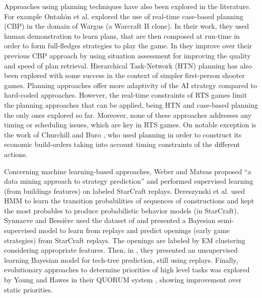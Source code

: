 \documentclass[journal]{IEEEtran}
\begin{document}
Approaches using planning techniques have also been explored in the literature. For example Onta\~{n}\'{o}n et al. \cite{CBR_Planning} explored the use of real-time case-based planning (CBP) in the domain of Wargus (a Warcraft II clone). In their work, they used human demonstration to learn plans, that are then composed at run-time in order to form full-fledges strategies to play the game. In \cite{PlanRetrieval} they improve over  their previous CBP approach by using situation assessment for improving the quality and speed of plan retrieval. Hierarchical Task-Network (HTN) planning has also been explored with some success in the context of simpler first-person shooter games. Planning approaches offer more adaptivity of the AI strategy compared to hard-coded approaches. However, the real-time constraints of RTS games limit the planning approaches that can be applied, being HTN and case-based planning the only ones explored so far. Moreover, none of these approaches addresses any timing or scheduling issues, which are key in RTS games. On notable exception is the work of Churchill and Buro \cite{churchill2011build}, who used planning in order to construct its economic build-orders taking into account timing constraints of the different actions.

Concerning machine learning-based approaches, Weber and Mateas \cite{WeberCig09} proposed ``a data mining approach to strategy prediction'' and performed supervised learning (from buildings features) on labeled StarCraft replays. Dereszynski et al. \cite{HMMstrat_RTS_AIIDE11} used HMM to learn the transition probabilities of sequences of constructions and kept the most probables to produce probabilistic behavior models (in StarCraft). Synnaeve and Bessi\`{e}re \cite{SynnaeveOpeningCig11} used the dataset of \cite{WeberCig09} and presented a Bayesian semi-supervised model to learn from replays and predict openings (early game strategies) from StarCraft replays. The openings are labeled by EM clustering considering appropriate features. Then, in \cite{SynnaeveAIIDE11}, they presented an unsupervised learning Bayesian model for tech-tree prediction, still using replays. %
Finally, evolutionary approaches to determine priorities of high level tasks was explored by Young and Hawes in their QUORUM system \cite{young2012evolutionary}, showing improvement over static priorities.
\end{document}
